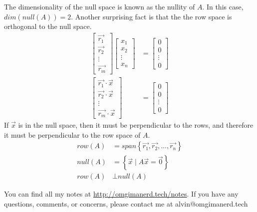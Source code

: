 \documentclass{math}
\begin{document}
The dimensionality of the null space is known as the nullity of \( A \). In this
case, \( dim(null(A)) = 2 \). Another surprising fact is that the the row space
is orthogonal to the null space.
\begin{align*}
  \begin{bmatrix}\vec{r_1} \\ \vec{r_2} \\ \vdots \\ \vec{r_m}\end{bmatrix}
    \begin{bmatrix}x_1 \\ x_2 \\ \vdots \\ x_n\end{bmatrix} &=
    \begin{bmatrix}0 \\ 0 \\ \vdots \\ 0\end{bmatrix} \\
  \begin{bmatrix}
    \vec{r_1}\cdot\vec{x} \\
    \vec{r_2}\cdot\vec{x} \\
    \vdots \\
    \vec{r_m}\cdot\vec{x}
  \end{bmatrix} &= \begin{bmatrix}0 \\ 0 \\ \vdots \\ 0\end{bmatrix}
\end{align*}
If \( \vec{x} \) is in the null space, then it must be perpendicular to the
rows, and therefore it must be perpendicular to the row space of \( A \).
\begin{align*}
  row(A) &= span\left\{\vec{r_1},\vec{r_2},\dots,\vec{r_n}\right\} \\
  null(A) &= \left\{\vec{x}\mid A\vec{x} = \vec{0}\right\} \\
  row(A) &\bot null(A)
\end{align*}

\begin{center}
  You can find all my notes at \url{http://omgimanerd.tech/notes}. If you have
  any questions, comments, or concerns, please contact me at
  alvin@omgimanerd.tech
\end{center}
\end{document}
